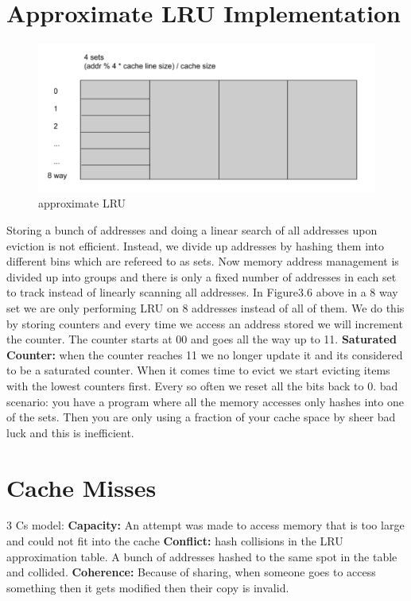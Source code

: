 \documentclass[twoside]{article}
\begin{document}
\section{Approximate LRU Implementation}
\begin{figure}[h!]
  \includegraphics[width=\linewidth]{fig6.png}
  \caption{approximate LRU}
  \label{fig:fig6}
\end{figure}
Storing a bunch of addresses and doing a linear search of all addresses upon eviction is not efficient. Instead, we divide up addresses by hashing them into different bins which are refereed to as sets. Now memory address management is divided up into groups and there is only a fixed number of addresses in each set to track instead of linearly scanning all addresses. In Figure3.6 above in a 8 way set we are only performing LRU on 8 addresses instead of all of them.
\newline
We do this by storing counters and every time we access an address stored we will increment the counter. The counter starts at 00 and goes all the way up to 11.
\newline
\textbf{Saturated Counter:} when the counter reaches 11 we no longer update it and its considered to be a saturated counter.
\newline
When it comes time to evict we start evicting items with the lowest counters first. Every so often we reset all the bits back to 0.
\newline
bad scenario: you have a program where all the memory accesses only hashes into one of the sets. Then you are only using a fraction of your cache space by sheer bad luck and this is inefficient.

\section{Cache Misses}
3 Cs model:
\newline
\textbf{Capacity:} An attempt was made to access memory that is too large and could not fit into the cache
\newline
\textbf{Conflict:} hash collisions in the LRU approximation table. A bunch of addresses hashed to the same spot in the table and collided. 
\newline
\textbf{Coherence:} Because of sharing, when someone goes to access something then it gets modified then their copy is invalid.
\end{document}
